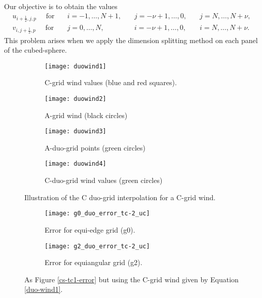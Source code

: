 Our objective is to obtain the values 
\begin{align*}
	u_{i+\frac{1}{2},j,p} \quad \text{ for} \quad &i=-1, \ldots, N+1, \quad &j=-\nu+1, \ldots, 0, \quad &j=N, \ldots, N+\nu,\\
	v_{i,j+\frac{1}{2},p} \quad \text{ for} \quad &j=0, \ldots, N, \quad &i=-\nu+1, \ldots, 0,\quad &i=N, \ldots, N+\nu.
\end{align*}
This problem arises when we apply the dimension splitting method on each panel of the cubed-sphere.
\begin{figure}[!htb]
	\centering
	\begin{subfigure}{0.45\textwidth}
		\centering
		\texttt{[image: duowind1]}
		\caption{C-grid wind values (blue and red squares).\label{cs-duovec-1}}
	\end{subfigure}
	\begin{subfigure}{0.45\textwidth}
		\centering
		\texttt{[image: duowind2]}
		\caption{A-grid wind (black circles)\label{cs-duovec-2}}
	\end{subfigure}
	
	\begin{subfigure}{0.45\textwidth}
		\centering
		\texttt{[image: duowind3]}
		\caption{A-duo-grid points (green circles)\label{cs-duovec-3}}
	\end{subfigure}
	\begin{subfigure}{0.45\textwidth}
		\centering
		\texttt{[image: duowind4]}
		\caption{C-duo-grid  wind values (green circles) \label{cs-duovec-4}}
	\end{subfigure}
	\caption{Illustration of the C duo-grid interpolation for a C-grid wind. \label{cs-duovec}}
\end{figure}

\begin{figure}[!htb]
	\centering
	\begin{subfigure}{0.45\textwidth}
		\centering
		\texttt{[image: g0\_duo\_error\_tc-2\_uc]}
		\caption{Error for equi-edge grid (g0).\label{cs-duoscalar-tc2-g0}}
	\end{subfigure}
	\begin{subfigure}{0.45\textwidth}
		\centering
		\texttt{[image: g2\_duo\_error\_tc-2\_uc]}
		\caption{Error for equiangular grid (g2).\label{cs-duoscalar-tc2-g2}}
	\end{subfigure}
	\caption{As Figure \ref{cs-tc1-error} but using the C-grid wind given by Equation \eqref{duo-wind1}.\label{cs-tc2-error}}
\end{figure}

